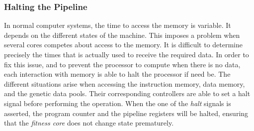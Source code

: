 \newpage
\subsubsection{Halting the Pipeline}

In normal computer systems, the time to access the memory is variable.
It depends on the different states of the machine.
This imposes a problem when several cores competes about access to the memory.
It is difficult to determine precisely the times that is actually used to receive the required data.
In order to fix this issue, and to prevent the processor to compute when there is no data, each interaction with memory is able to halt the processor if need be.
The different situations arise when accessing the instruction memory, data memory, and the genetic data pools.
Their corresponding controllers are able to set a halt signal before performing the operation.
When the one of the \emph{halt} signals is asserted, the program counter and the pipeline registers will be halted, ensuring that the \emph{fitness core} does not change state prematurely. 
